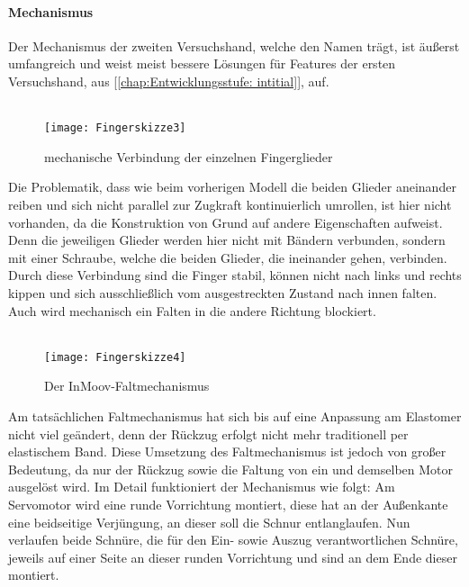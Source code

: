 \documentclass[titlepage,12pt,twoside]{article}
\begin{document}
\paragraph{Mechanismus}
\label{par:Mechanismus_zweite_Hand}
\hfill \break
\hfill \break
Der Mechanismus der zweiten Versuchshand, welche den Namen  trägt, ist äußerst umfangreich und weist meist bessere Lösungen für Features der ersten Versuchshand, aus [\textcolor{blue}{\autoref{chap:Entwicklungsstufe: intitial}}], auf. \\
\\
\begin{figure}[H]
	\begin{center}
		\scalebox{0.9}
		{\texttt{[image: Fingerskizze3]}}
		\caption{mechanische Verbindung der einzelnen Fingerglieder}
		\label{fig:Fingerskizze3}			
	\end{center}
\end{figure}
\hfill \break
Die Problematik, dass wie beim vorherigen Modell die beiden Glieder aneinander reiben und sich nicht parallel zur Zugkraft kontinuierlich umrollen, ist hier nicht vorhanden, da die Konstruktion von Grund auf andere Eigenschaften aufweist. 
Denn die jeweiligen Glieder werden hier nicht mit Bändern verbunden, sondern mit einer Schraube, welche die beiden Glieder, die ineinander gehen, verbinden. Durch diese Verbindung sind die Finger stabil, können nicht nach links und 
rechts kippen und sich ausschließlich vom ausgestreckten Zustand nach innen falten. Auch wird mechanisch ein Falten in die andere Richtung blockiert. \\
\\
\begin{figure}[H]
	\begin{center}
		\scalebox{0.8}
		{\texttt{[image: Fingerskizze4]}}
		\caption{Der InMoov-Faltmechanismus}
		\label{fig:Fingerskizze4}			
	\end{center}
\end{figure}
\hfill \break
Am tatsächlichen Faltmechanismus hat sich bis auf eine Anpassung am Elastomer nicht viel geändert, denn der Rückzug erfolgt nicht mehr traditionell per elastischem Band. Diese Umsetzung des Faltmechanismus ist jedoch von großer Bedeutung, da 
nur der Rückzug sowie die Faltung von ein und demselben Motor ausgelöst wird. Im Detail funktioniert der Mechanismus wie folgt: Am Servomotor wird eine runde Vorrichtung montiert, diese hat an der Außenkante 
eine beidseitige Verjüngung, an dieser soll die Schnur entlanglaufen. Nun verlaufen beide Schnüre, die für den Ein- sowie Auszug verantwortlichen Schnüre, jeweils auf einer Seite an dieser runden Vorrichtung und sind an dem Ende dieser montiert. 
\end{document}

